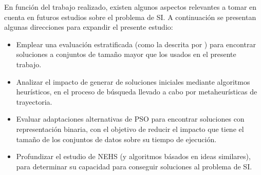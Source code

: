 En función del trabajo realizado, existen algunos aspectos relevantes a tomar en cuenta en futuros estudios sobre el problema de SI. A continuación se presentan algunas direcciones para expandir el presente estudio:

\begin{itemize}
\item Emplear una evaluación estratificada (como la descrita por \cite{cano2003using}) para encontrar soluciones a conjuntos de tamaño mayor que los usados en el presente trabajo.
\item Analizar el impacto de generar de soluciones iniciales mediante algoritmos heurísticos, en el proceso de búsqueda llevado a cabo por metaheurísticas de trayectoria.
\item Evaluar adaptaciones alternativas de PSO para encontrar soluciones con representación binaria, con el objetivo de reducir el impacto que tiene el tamaño de los conjuntos de datos sobre su tiempo de ejecución.
\item Profundizar el estudio de NEHS (y algoritmos básados en ideas similares), para determinar su capacidad para conseguir soluciones al problema de SI.
\end{itemize}
